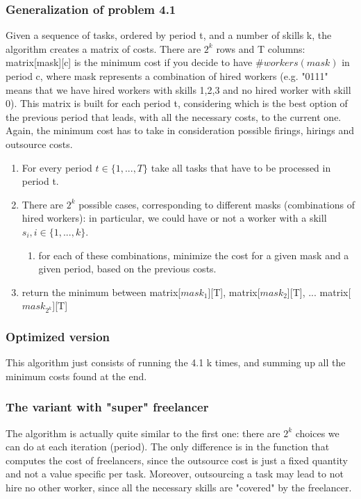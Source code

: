 \subsubsection{Generalization of problem 4.1}
Given a sequence of tasks, ordered by period t, and a number of skills k, the algorithm creates a matrix of costs. There are $2^k$ rows and T columns: matrix[mask][c] is the minimum cost if you decide to have $\# workers(mask)$ in period c, where mask represents a combination of hired workers (e.g. "0111" means that we have hired workers with skills 1,2,3 and no hired worker with skill 0). This matrix is built for each period t, considering which is the best option of the previous period that leads, with all the necessary costs, to the current one. Again, the minimum cost has to take in consideration possible firings, hirings and outsource costs.
\begin{enumerate}
	\item For every period $t \in \{1,..., T\}$ take all tasks that have to be processed in period t.
	\item There are $2^k$ possible cases, corresponding to different masks (combinations of hired workers): in particular, we could have or not a worker with a skill $s_i, i \in \{1, ..., k\}$.
	\begin{enumerate}
		\item for each of these combinations, minimize the cost for a given mask and a given period, based on the previous costs.
	\end{enumerate}
	\item return the minimum between matrix[$mask_1$][T], matrix[$mask_2$][T], ... matrix[$mask_{2^k}$][T]
\end{enumerate}
\subsubsection{Optimized version}
This algorithm just consists of running the 4.1 k times, and summing up all the minimum costs found at the end.
\subsubsection{The variant with "super" freelancer}
The algorithm is actually quite similar to the first one: there are $2^k$ choices we can do at each iteration (period). The only difference is in the function that computes the cost of freelancers, since the outsource cost is just a fixed quantity and not a value specific per task. Moreover, outsourcing a task may lead to not hire no other worker, since all the necessary skills are "covered" by the freelancer.

